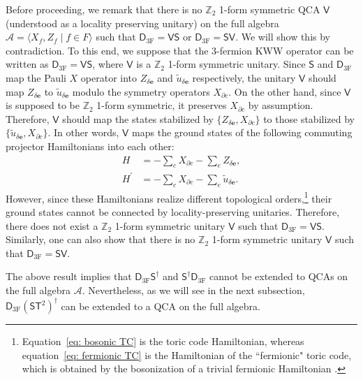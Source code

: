 \documentclass[aps,twocolumn,prx,floatfix,preprintnumbers, nofootinbib,10pt]{revtex4-2}
\numberwithin{equation}{section}
\theoremstyle{definition}
\theoremstyle{remark}
\theoremstyle{claim}
\renewcommand{\sf}[1]{\mathsf{#1}}
\begin{document}
Before proceeding, we remark that there is no $\mathbb{Z}_2$ 1-form symmetric QCA $\sf{V}$ (understood as a locality preserving unitary) on the full algebra $\mathcal{A} = \langle X_f, Z_f \mid f \in F \rangle$ such that $\mathsf{D}_\text{3F} = \sf{V} \mathsf{S}$ or $\mathsf{D}_\text{3F} = \mathsf{S} \sf{V}$.
We will show this by contradiction. 
To this end, we suppose that the 3-fermion KWW operator can be written as $\mathsf{D}_\text{3F} = \sf{V} \mathsf{S}$, where $\sf{V}$ is a $\mathbb{Z}_2$ 1-form symmetric unitary.
Since $\mathsf{S}$ and $\sf{D}_\text{3F}$ map the Pauli $X$ operator into $Z_{\delta \bm{e}}$ and $\tilde{u}_{\delta \bm{e}}$ respectively, the unitary $\sf{V}$ should map $Z_{\delta \bm{e}}$ to $\tilde{u}_{\delta \bm{e}}$ modulo the symmetry operators $X_{\partial c}$.
On the other hand, since $\sf{V}$ is supposed to be $\mathbb{Z}_2$ 1-form symmetric, it preserves $X_{\partial c}$ by assumption.
Therefore, $\sf{V}$ should map the states stabilized by $\{Z_{\delta \bm{e}}, X_{\partial c}\}$ to those stabilized by $\{\tilde{u}_{\delta \bm{e}}, X_{\partial c}\}$.
In other words, $\sf{V}$ maps the ground states of the following commuting projector Hamiltonians into each other:
\begin{align}
H &= -\sum_{c} X_{\partial c} - \sum_{e} Z_{\delta \bm{e}},
\label{eq: bosonic TC}
\\
H^{\prime} &= -\sum_{c} X_{\partial c} - \sum_{e} \tilde{u}_{\delta \bm{e}}.
\label{eq: fermionic TC}
\end{align}
However, since these Hamiltonians realize different topological orders,\footnote{Equation~\eqref{eq: bosonic TC} is the toric code Hamiltonian, whereas equation~\eqref{eq: fermionic TC} is the Hamiltonian of the ``fermionic" toric code, which is obtained by the bosonization of a trivial fermionic Hamiltonian \cite{Chen:2018nog, Chen_2023}.} their ground states cannot be connected by locality-preserving unitaries.
Therefore, there does not exist a $\mathbb{Z}_2$ 1-form symmetric unitary $\sf{V}$ such that $\sf{D}_\text{3F} = \sf{V} \mathsf{S}$.
Similarly, one can also show that there is no $\mathbb{Z}_2$ 1-form symmetric unitary $\sf{V}$ such that $\sf{D}_\text{3F} = \mathsf{S} \sf{V}$.

The above result implies that $\mathsf{D}_\text{3F} \mathsf{S}^{\dagger}$ and $\mathsf{S}^{\dagger} \sf{D}_\text{3F}$ cannot be extended to QCAs on the full algebra $\mathcal{A}$.
Nevertheless, as we will see in the next subsection, $\sf{D}_\text{3F} (\mathsf{S}\sf{T}^2)^{\dagger}$ can be extended to a QCA on the full algebra.
\end{document}
